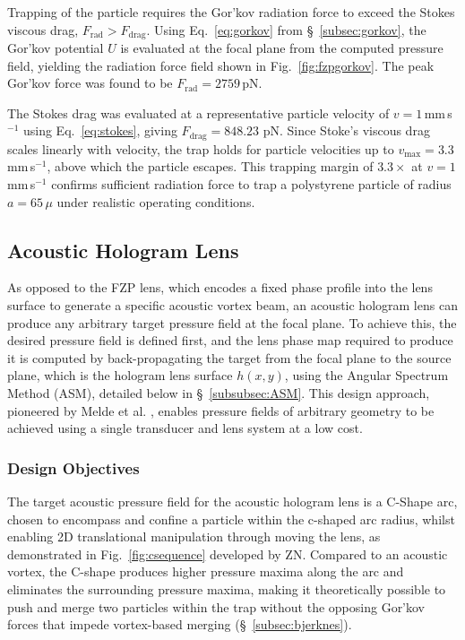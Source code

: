 \documentclass[11pt,a4paper]{article}
\begin{document}
Trapping of the particle requires the Gor'kov radiation force to exceed the Stokes viscous drag, $F_{\mathrm{rad}} > F_{\mathrm{drag}}$. Using Eq.~\ref{eq:gorkov} from \S~\ref{subsec:gorkov}, the Gor'kov potential $U$ is evaluated at the focal plane from the computed pressure field, yielding the radiation force field shown in Fig.~\ref{fig:fzpgorkov}. The peak Gor'kov force was found to be $F_{\mathrm{rad}} = 2759$\,pN.

The Stokes drag was evaluated at a representative particle velocity of $v = 1$\,mm\,s$^{-1}$ using Eq.~\ref{eq:stokes}, giving $F_\text{drag} = 848.23$ pN. Since Stoke's viscous drag scales linearly with velocity, the trap holds for particle velocities up to $v_\text{max} = 3.3$\,mm\,s$^{-1}$, above which the particle escapes. This trapping margin of $3.3\times$ at $v = 1$\,mm\,s$^{-1}$ confirms sufficient radiation force to trap a polystyrene particle of radius $a = 65\,\mu$ under realistic operating conditions.

\subsection{Acoustic Hologram Lens}
\label{subsec:hologram}

As opposed to the FZP lens, which encodes a fixed phase profile into the lens surface to generate a specific acoustic vortex beam, an acoustic hologram lens can produce any arbitrary target pressure field at the focal plane. To achieve this, the desired pressure field is defined first, and the lens phase map required to produce it is computed by back-propagating the target from the focal plane to the source plane, which is the hologram lens surface $h(x,y)$, using the Angular Spectrum Method (ASM), detailed below in \S~\ref{subsubsec:ASM}. This design approach, pioneered by Melde et al. \cite{melde2016holograms}, enables pressure fields of arbitrary geometry to be achieved using a single transducer and lens system at a low cost.  

\subsubsection{Design Objectives}

The target acoustic pressure field for the acoustic hologram lens is a C-Shape arc, chosen to encompass and confine a particle within the c-shaped arc radius, whilst enabling 2D translational manipulation through moving the lens, as demonstrated in Fig.~\ref{fig:csequence} developed by ZN. Compared to an acoustic vortex, the C-shape produces higher pressure maxima along the arc and eliminates the surrounding pressure maxima, making it theoretically possible to push and merge two particles within the trap without the opposing Gor'kov forces that impede vortex-based merging 
(\S~\ref{subsec:bjerknes}).
\end{document}
